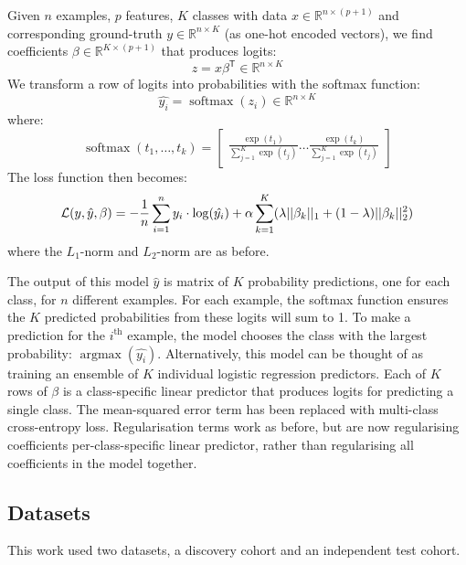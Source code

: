 \documentclass{article} %
\DeclareMathOperator*{\argmax}{argmax}
\DeclareMathOperator*{\softmax}{softmax}
\newcommand{\equationname}[1]{%
    \begingroup
        \leavevmode
        \addcontentsline{equ}{equations}{\protect\numberline{\theequation}#1}%
    \endgroup   
}
\begin{document}
Given \(n\) examples, \(p\) features, \(K\) classes with data \(x \in \mathbb{R}^{n \times (p + 1)}\) and corresponding ground-truth \(y \in \mathbb{R}^{n \times K}\) (as one-hot encoded vectors), we find coefficients \(\beta \in \mathbb{R}^{K \times (p + 1)}\) that produces logits:
\[z = x \beta^\mathsf{T} \in \mathbb{R}^{n \times K}\]
We transform a row of logits into probabilities with the softmax function:
\[\hat{y_i} = \softmax(z_i) \in \mathbb{R}^{n \times K}\]
where:
\[\softmax(t_1,\hdots , t_k) =
    \begin{bmatrix}
        \frac{\exp(t_1)}{\sum_{j=1}^{K} \exp(t_j)}
        \hdots
        \frac{\exp(t_k)}{\sum_{j=1}^{K} \exp(t_j)}
    \end{bmatrix}
\]
The loss function then becomes:
\begin{equation} \equationname{Elastic Net logistic regression} \label{eqn:mc_log_elastic_net}
    \mathcal{L}(y, \hat{y}, \beta) = -\frac{1}{n}\sum_{i=1}^{n} y_i \cdot \log(\hat{y_i}) + \alpha\sum_{k=1}^{K}(\lambda||\beta_k||_1 + (1 - \lambda)||\beta_k||_2^2)
\end{equation}
where the \(L_1\)-norm and \(L_2\)-norm are as before.

The output of this model \(\hat{y}\) is matrix of \(K\) probability predictions, one for each class, for \(n\) different examples. For each example, the softmax function ensures the \(K\) predicted probabilities from these logits will sum to 1. To make a prediction for the \(i^\text{th}\) example, the model chooses the class with the largest probability: \(\argmax(\hat{y_i})\). Alternatively, this model can be thought of as training an ensemble of \(K\) individual logistic regression predictors. Each of \(K\) rows of \(\beta\) is a class-specific linear predictor that produces logits for predicting a single class. The mean-squared error term has been replaced with multi-class cross-entropy loss. Regularisation terms work as before, but are now regularising coefficients per-class-specific linear predictor, rather than regularising all coefficients in the model together.

\subsection{Datasets}
This work used two datasets, a discovery cohort and an independent test cohort.
\end{document}
